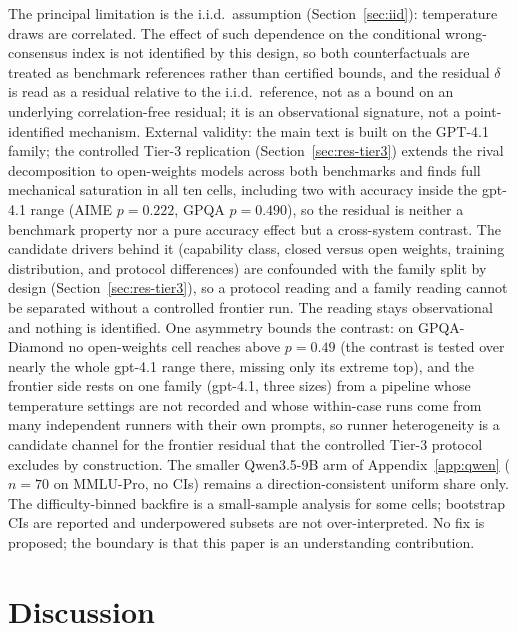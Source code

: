 \documentclass[a4paper,fleqn]{cas-sc}
\begin{document}
The principal limitation is the i.i.d.\ assumption (Section~\ref{sec:iid}):
temperature draws are correlated. The effect of such dependence on the
conditional wrong-consensus index is not identified by this design, so
both counterfactuals are treated as benchmark
references rather than certified bounds, and the residual $\delta$ is
read as a residual relative to the i.i.d.\ reference, not as a bound on
an underlying correlation-free residual; it is
an observational signature, not a point-identified mechanism. External
validity: the main text is built on the GPT-4.1 family; the controlled
Tier-3 replication (Section~\ref{sec:res-tier3}) extends the rival
decomposition to open-weights models across both benchmarks and finds
full mechanical saturation in all ten cells, including two with accuracy
inside the gpt-4.1 range (AIME $p=0.222$, GPQA $p=0.490$), so the residual is neither a
benchmark property nor a pure accuracy effect but a cross-system
contrast. The candidate drivers behind it (capability class, closed versus open weights, training distribution, and protocol differences) are confounded with the family split by design (Section~\ref{sec:res-tier3}), so a protocol reading and a family reading cannot be separated without a controlled frontier run. The
reading stays observational and nothing is identified. One asymmetry bounds the contrast: on
GPQA-Diamond no open-weights cell reaches above $p=0.49$ (the contrast is
tested over nearly the whole gpt-4.1 range there, missing only its
extreme top), and the
frontier side rests on one family (gpt-4.1, three sizes) from a
pipeline whose temperature settings are not recorded and whose
within-case runs come from many independent runners with their own
prompts, so runner heterogeneity is a candidate channel for the
frontier residual that the controlled Tier-3 protocol excludes by
construction. The smaller
Qwen3.5-9B arm of Appendix~\ref{app:qwen} ($n=70$ on MMLU-Pro, no CIs)
remains a direction-consistent uniform share only. The difficulty-binned backfire is a small-sample analysis for some
cells; bootstrap CIs are reported and underpowered subsets are not
over-interpreted. No fix is proposed; the boundary is that this
paper is an understanding contribution.

\section{Discussion}
\label{sec:discussion}
\end{document}
